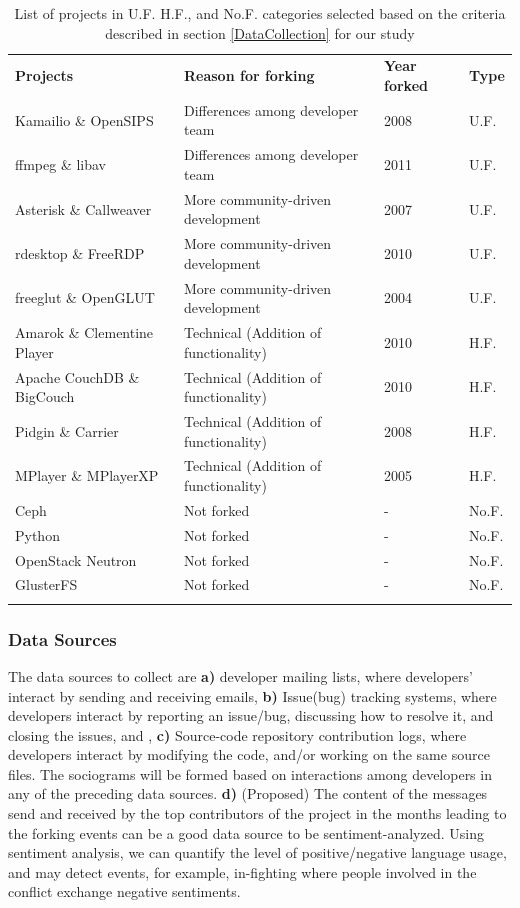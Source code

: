 \documentclass[11pt]{report}
\begin{document}
\begin{table}
\centering
\caption{List of projects in U.F. H.F., and No.F. categories selected based on the criteria described in section \ref{DataCollection} for our study}
\label{forkedProjectsDataCollected}
\begin{tabular}{p{} p{} p{} p{}}
\hline\noalign{\smallskip}
\textbf{Projects} & \textbf{Reason for forking} & \textbf{Year forked} & \textbf{Type}\\
\noalign{\smallskip}\hline\noalign{\smallskip}
Kamailio \& OpenSIPS & Differences among developer team & 2008 & U.F.\\ \hline
ffmpeg \& libav & Differences among developer team & 2011 & U.F.\\ \hline
Asterisk \& Callweaver & More community-driven development & 2007 & U.F.\\ \hline
rdesktop \& FreeRDP  & More community-driven development & 2010 & U.F.\\ \hline
freeglut \& OpenGLUT & More community-driven development & 2004 & U.F.\\ \hline
Amarok \& Clementine Player & Technical (Addition of functionality) & 2010 & H.F.\\ \hline
Apache CouchDB \& BigCouch & Technical (Addition of functionality) & 2010 & H.F.\\ \hline
Pidgin \& Carrier & Technical (Addition of functionality) & 2008 & H.F.\\ \hline
MPlayer \& MPlayerXP & Technical (Addition of functionality) & 2005 & H.F.\\ \hline
Ceph  & Not forked & - & No.F.\\ \hline
Python & Not forked & - & No.F.\\ \hline
OpenStack Neutron & Not forked & - & No.F.\\ \hline
GlusterFS & Not forked & - & No.F.\\ 
\noalign{\smallskip}\hline
\end{tabular}
\end{table}

\subsubsection{Data Sources}
The data sources to collect are \textbf{a)} developer mailing lists, where developers' interact by sending and receiving emails, \textbf{b)} Issue(bug) tracking systems, where developers interact by reporting an issue/bug, discussing how to resolve it, and closing the issues, and , \textbf{c)} Source-code repository contribution logs, where developers interact by modifying the code, and/or working on the same source files. The sociograms will be formed based on interactions among developers in any of the preceding data sources. \textbf{d)} (Proposed) The content of the messages send and received by the top contributors of the project in the months leading to the forking events can be a good data source to be sentiment-analyzed. Using sentiment analysis, we can quantify the level of positive/negative language usage, and may detect events, for example, in-fighting where people involved in the conflict exchange negative sentiments.
\end{document}
